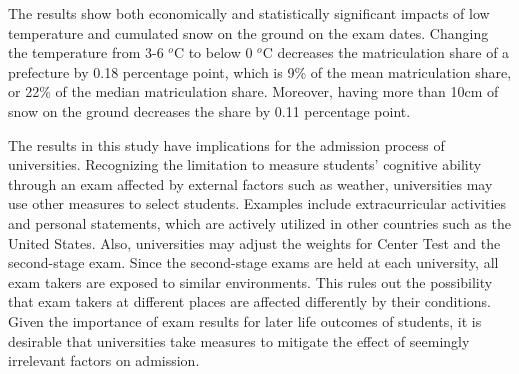 \documentclass[12pt,letterpaper]{article}
\begin{document}
The results show both economically and statistically significant impacts of low temperature and cumulated snow on the ground on the exam dates.
Changing the temperature from 3-6 $^o$C to below 0 $^o$C decreases the matriculation share of a prefecture by 0.18 percentage point, which is 9\% of the mean matriculation share, or 22\% of the median matriculation share.
Moreover, having more than 10cm of snow on the ground decreases the share by 0.11 percentage point.

The results in this study have implications for the admission process of universities.
Recognizing the limitation to measure students' cognitive ability through an exam affected by external factors such as weather, universities may use other measures to select students.
Examples include extracurricular activities and personal statements, which are actively utilized in other countries such as the United States.
Also, universities may adjust the weights for Center Test and the second-stage exam.
Since the second-stage exams are held at each university, all exam takers are exposed to similar environments.
This rules out the possibility that exam takers at different places are affected differently by their conditions.
Given the importance of exam results for later life outcomes of students, it is desirable that universities take measures to mitigate the effect of seemingly irrelevant factors on admission.

\clearpage


\end{document}

